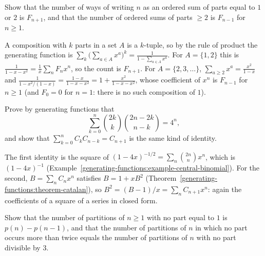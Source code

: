 \begin{exercise}\label{generating-functions:exercise-compositions-one-two}
Show that the number of ways of writing $n$ as an ordered sum of parts equal to $1$ or $2$ is $F_{n+1}$, and that the number of ordered sums of parts $\geq 2$ is $F_{n-1}$ for $n \geq 1$.
\end{exercise}

\begin{solution}
A composition with $k$ parts in a set $A$ is a $k$-tuple, so by the rule of product the generating function is $\sum_k\bigl(\sum_{a \in A}x^a\bigr)^k = \frac{1}{1 - \sum_{a \in A}x^a}$. For $A = \{1, 2\}$
this is $\frac{1}{1 - x - x^2} = \frac{1}{x}\sum_nF_nx^n$, so the count is $F_{n+1}$. For $A = \{2, 3, \ldots\}$, $\sum_{a \geq 2}x^a = \frac{x^2}{1 - x}$ and
$\frac{1}{1 - x^2/(1 - x)} = \frac{1 - x}{1 - x - x^2} = 1 + \frac{x^2}{1 - x - x^2}$, whose coefficient of $x^n$ is $F_{n-1}$ for $n \geq 1$ (and $F_0 = 0$ for $n = 1$: there is no such composition of $1$).
\end{solution}

\begin{exercise}\label{generating-functions:exercise-central-convolution}
Prove by generating functions that
\[
\sum_{k=0}^{n}\binom{2k}{k}\binom{2n - 2k}{n - k} = 4^n,
\]
and show that $\sum_{k=0}^{n}C_kC_{n-k} = C_{n+1}$ is the same kind of identity.
\end{exercise}

\begin{solution}
The first identity is the square of $(1 - 4x)^{-1/2} = \sum_n\binom{2n}{n}x^n$, which is $(1 - 4x)^{-1}$ (Example~\ref{generating-functions:example-central-binomial}). For the second, $B = \sum_nC_nx^n$
satisfies $B = 1 + xB^2$ (Theorem~\ref{generating-functions:theorem-catalan}), so $B^2 = (B - 1)/x = \sum_nC_{n+1}x^n$: again the coefficients of a square of a series in closed form.
\end{solution}

\begin{exercise}\label{generating-functions:exercise-no-part-one}
Show that the number of partitions of $n \geq 1$ with no part equal to $1$ is $p(n) - p(n - 1)$, and that the number of partitions of $n$ in which no part occurs more than twice equals the number of
partitions of $n$ with no part divisible by $3$.
\end{exercise}


